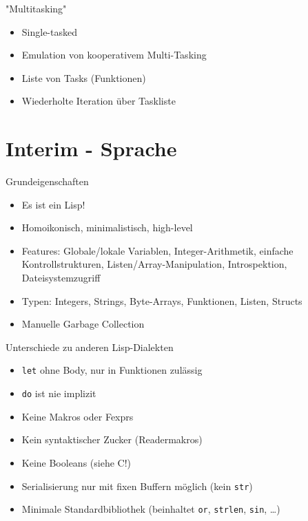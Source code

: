 \documentclass[presentation]{beamer}
\begin{document}
\begin{frame}[label=sec-2-9]{"Multitasking"}
\begin{itemize}
\item Single-tasked
\item Emulation von kooperativem Multi-Tasking
\item Liste von Tasks (Funktionen)
\item Wiederholte Iteration über Taskliste
\end{itemize}
\end{frame}

\section{Interim - Sprache}
\label{sec-3}

\begin{frame}[label=sec-3-1]{Grundeigenschaften}
\begin{itemize}
\item Es ist ein Lisp!
\item Homoikonisch, minimalistisch, high-level
\item Features: Globale/lokale Variablen, Integer-Arithmetik, einfache
Kontrollstrukturen, Listen/Array-Manipulation, Introspektion,
Dateisystemzugriff
\item Typen: Integers, Strings, Byte-Arrays, Funktionen, Listen, Structs
\item Manuelle Garbage Collection
\end{itemize}
\end{frame}

\begin{frame}[fragile,label=sec-3-2]{Unterschiede zu anderen Lisp-Dialekten}
 \begin{itemize}
\item \texttt{let} ohne Body, nur in Funktionen zulässig
\item \texttt{do} ist nie implizit
\item Keine Makros oder Fexprs
\item Kein syntaktischer Zucker (Readermakros)
\item Keine Booleans (siehe C!)
\item Serialisierung nur mit fixen Buffern möglich (kein \texttt{str})
\item Minimale Standardbibliothek (beinhaltet \texttt{or}, \texttt{strlen}, \texttt{sin}, \ldots{})
\end{itemize}
\end{frame}
\end{document}
